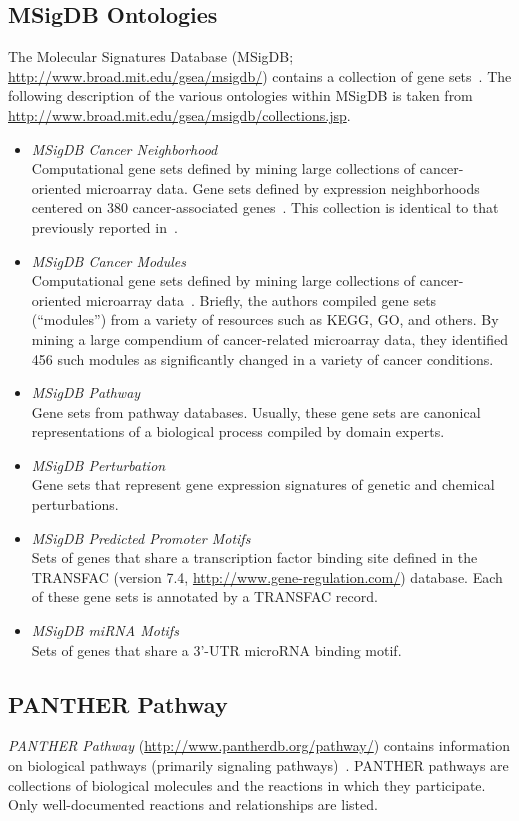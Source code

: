 \subsection{MSigDB Ontologies}
The Molecular Signatures Database (MSigDB; \url{http://www.broad.mit.edu/gsea/msigdb/}) contains a collection of
gene sets~\citep{Subramanian2005}. 
The following description of the various ontologies within MSigDB is taken from
\url{http://www.broad.mit.edu/gsea/msigdb/collections.jsp}.

\begin{itemize}
\item \emph{MSigDB Cancer Neighborhood}\\
Computational gene sets defined by mining large collections of
cancer-oriented microarray data. Gene sets defined by expression
neighborhoods centered on 380 cancer-associated
genes~\citep{Brentani2003}. This collection is identical to that previously
reported in~\citep{Subramanian2005}.
\item \emph{MSigDB Cancer Modules}\\
Computational gene sets defined by mining large collections of
cancer-oriented microarray data~\citep{Segal2004}.  Briefly, the authors
compiled gene sets (``modules'') from a variety of resources such as KEGG,
GO, and others. By mining a large compendium of cancer-related microarray
data, they identified 456 such modules as significantly changed in a variety
of cancer conditions.
\item \emph{MSigDB Pathway}\\
Gene sets from pathway databases. Usually, these gene sets are canonical
representations of a biological process compiled by domain experts.
\item \emph{MSigDB Perturbation}\\
Gene sets that represent gene expression signatures of genetic and chemical perturbations. 
\item \emph{MSigDB Predicted Promoter Motifs}\\
Sets of genes that share a transcription factor binding site defined in the TRANSFAC (version 7.4,
\url{http://www.gene-regulation.com/}) database. Each of these gene sets is annotated by a TRANSFAC record.
\item \emph{MSigDB miRNA Motifs}\\
Sets of genes that share a 3'-UTR microRNA binding motif.
\end{itemize}

\subsection{PANTHER Pathway}
\emph{PANTHER Pathway} (\url{http://www.pantherdb.org/pathway/}) contains information on biological 
pathways (primarily signaling pathways)~\citep{Mi2007}. PANTHER pathways are
collections of biological molecules and the reactions in which they
participate. Only well-documented reactions and relationships are listed.


